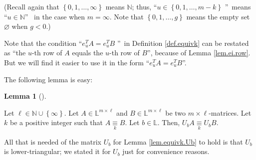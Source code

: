 \documentclass[numbers=enddot,12pt,final,onecolumn,notitlepage]{scrartcl}%
\theoremstyle{definition}
\newtheorem{lem}[theo]{Lemma}
\newenvironment{lemma}[1][]
{\begin{lem}[#1]\begin{leftbar}}
{\end{leftbar}\end{lem}}
\begin{document}
(Recall again that $\left\{  0,1,\ldots,\infty\right\}  $ means $\mathbb{N}$;
thus, \textquotedblleft$u\in\left\{  0,1,\ldots,m-k\right\}  $%
\textquotedblright\ means \textquotedblleft$u\in\mathbb{N}$\textquotedblright%
\ in the case when $m=\infty$. Note that $\left\{  0,1,\ldots,g\right\}  $
means the empty set $\varnothing$ when $g<0$.)

Note that the condition \textquotedblleft$e_{u}^{T}A=e_{u}^{T}B$%
\textquotedblright\ in Definition \ref{def.equivk} can be restated as
\textquotedblleft the $u$-th row of $A$ equals the $u$-th row of
$B$\textquotedblright, because of Lemma \ref{lem.ei.row}. But we will find it
easier to use it in the form \textquotedblleft$e_{u}^{T}A=e_{u}^{T}%
B$\textquotedblright.

The following lemma is easy:

\begin{lemma}
\label{lem.equivk.Ub}Let $\ell\in\mathbb{N}\cup\left\{  \infty\right\}  $. Let
$A\in\mathbb{L}^{m\times\ell}$ and $B\in\mathbb{L}^{m\times\ell}$ be two
$m\times\ell$-matrices. Let $k$ be a positive integer such that
$A\underset{k}{\equiv}B$. Let $b\in\mathbb{L}$. Then, $U_{b}%
A\underset{k}{\equiv}U_{b}B$.
\end{lemma}

All that is needed of the matrix $U_{b}$ for Lemma \ref{lem.equivk.Ub} to hold
is that $U_{b}$ is lower-triangular; we stated it for $U_{b}$ just for
convenience reasons.
\end{document}
